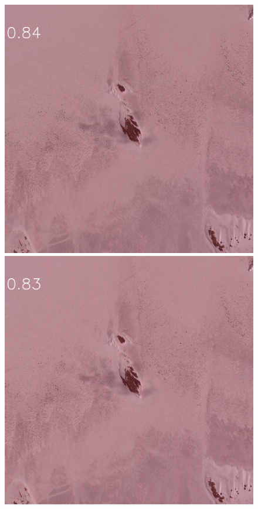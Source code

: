 \documentclass[runningheads]{llncs}
\begin{document}
\begin{figure}[h]
\includegraphics[width=\subFigx]{./fig/datagrow/MSE_single_unet_train_0_3.txt_bias-1_bs128_do0.1e25/WV02_20160101055824_103001004E1BFF00_16JAN01055824-M1BS-500637502050_01_P007_u08rf3031.png}
\includegraphics[width=\subFigx]{./fig/datagrow/MSE_single_unet_train_0_4.txt_bias-1_bs128_do0.1e25/WV02_20160101055824_103001004E1BFF00_16JAN01055824-M1BS-500637502050_01_P007_u08rf3031.png}


\end{figure}
\end{document}
